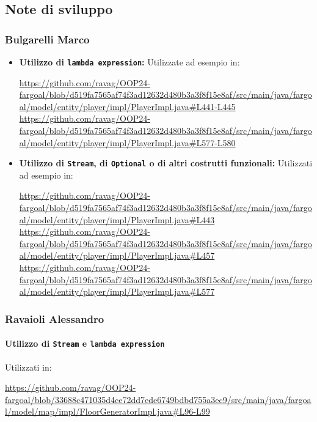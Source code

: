 \documentclass{report}
\begin{document}
\subsection{Note di sviluppo}

\subsubsection{Bulgarelli Marco}

\begin{itemize}
    \item \textbf{Utilizzo di \texttt{lambda expression}:}\newline
    Utilizzate ad esempio in:
    \begin{sloppypar}
        \url{https://github.com/ravag/OOP24-fargoal/blob/d519fa7565af74f3ad12632d480b3a3f8f15e8af/src/main/java/fargoal/model/entity/player/impl/PlayerImpl.java#L441-L445}\newline
        \url{https://github.com/ravag/OOP24-fargoal/blob/d519fa7565af74f3ad12632d480b3a3f8f15e8af/src/main/java/fargoal/model/entity/player/impl/PlayerImpl.java#L577-L580}
    \end{sloppypar}
    \item \textbf{Utilizzo di \texttt{Stream}, di \texttt{Optional} o di altri costrutti funzionali:}\newline
    Utilizzati ad esempio in:
    \begin{sloppypar}
        \url{https://github.com/ravag/OOP24-fargoal/blob/d519fa7565af74f3ad12632d480b3a3f8f15e8af/src/main/java/fargoal/model/entity/player/impl/PlayerImpl.java#L443}\newline
        \url{https://github.com/ravag/OOP24-fargoal/blob/d519fa7565af74f3ad12632d480b3a3f8f15e8af/src/main/java/fargoal/model/entity/player/impl/PlayerImpl.java#L457}\newline
        \url{https://github.com/ravag/OOP24-fargoal/blob/d519fa7565af74f3ad12632d480b3a3f8f15e8af/src/main/java/fargoal/model/entity/player/impl/PlayerImpl.java#L577}
    \end{sloppypar}
\end{itemize}

\subsubsection{Ravaioli Alessandro}
\paragraph{Utilizzo di \texttt{Stream} e \texttt{lambda expression}}
Utilizzati in: 
\begin{sloppypar}
    \url{https://github.com/ravag/OOP24-fargoal/blob/33688c471035d4ce72dd7ede6749bdbd755a3ec9/src/main/java/fargoal/model/map/impl/FloorGeneratorImpl.java#L96-L99}
\end{sloppypar}
\end{document}

